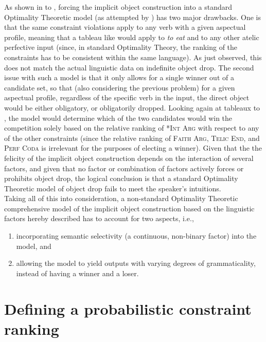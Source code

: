 As shown in  to , forcing the implicit object construction into a standard Optimality Theoretic model (as attempted by \textcite{yankes2021objectdropot}) has two major drawbacks. One is that the same constraint violations apply to any verb with a given aspectual profile, meaning that a tableau like  would apply to \textit{to eat} and to any other atelic perfective input (since, in standard Optimality Theory, the ranking of the constraints has to be consistent within the same language). As just observed, this does not match the actual linguistic data on indefinite object drop. The second issue with such a model is that it only allows for a single winner out of a candidate set, so that (also considering the previous problem) for a given aspectual profile, regardless of the specific verb in the input, the direct object would be either obligatory, or obligatorily dropped. Looking again at tableaux  to , the model would determine which of the two candidates would win the competition solely based on the relative ranking of \textsc{*Int Arg} with respect to any of the other constraints (since the relative ranking of \textsc{Faith Arg}, \textsc{Telic End}, and \textsc{Perf Coda} is irrelevant for the purposes of electing a winner). Given that the the felicity of the implicit object construction depends on the interaction of several factors, and given that no factor or combination of factors actively forces or prohibits object drop, the logical conclusion is that a standard Optimality Theoretic model of object drop fails to meet the speaker's intuitions.\\
Taking all of this into consideration, a non-standard Optimality Theoretic comprehensive model of the implicit object construction based on the linguistic factors hereby described has to account for two aspects, i.e.,
\begin{enumerate}
    \item incorporating semantic selectivity (a continuous, non-binary factor) into the model, and
    \item allowing the model to yield outputs with varying degrees of grammaticality, instead of having a winner and a loser.
\end{enumerate}

\section{Defining a probabilistic constraint ranking} 

